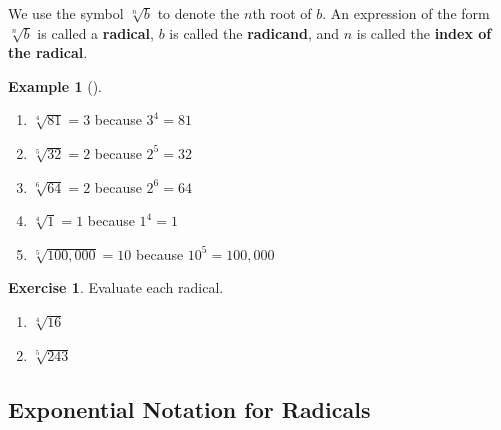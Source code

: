 \documentclass[10pt,]{book}
\newcommand{\terminology}[1]{\textbf{#1}}
\theoremstyle{plain}
\theoremstyle{definition}
\theoremstyle{definition}
\theoremstyle{definition}
\newtheorem{example}[theorem]{Example}
\theoremstyle{definition}
\theoremstyle{definition}
\newtheorem{exercise}[theorem]{Exercise}
\numberwithin{equation}{section}
\begin{document}
   We use the symbol \(\sqrt[n]{b}\) to denote the \(n\)th root of \(b\). An expression of the form \(\sqrt[n]{b}\) is called a \terminology{radical}, \(b\) is called the \terminology{radicand}, and \(n\) is called the \terminology{index of the radical}. 
%
\begin{example}[]\label{example-nth-roots}
\leavevmode%
\begin{enumerate}[label=*\alph**]
\item\hypertarget{li-460}{}\(\sqrt[4]{81} = 3\) because \(3^4 = 81\)\item\hypertarget{li-461}{}\(\sqrt[5]{32} = 2\) because \(2^5 = 32\)\item\hypertarget{li-462}{}\(\sqrt[6]{64} = 2\) because \(2^6 = 64\)\item\hypertarget{li-463}{}\(\sqrt[4]{1} = 1\) because \(1^4 = 1\)\item\hypertarget{li-464}{}\(\sqrt[5]{100,000} = 10\) because \(10^5 = 100,000\)\end{enumerate}
\end{example}
\begin{exercise}\label{exercise-nth-roots}
Evaluate each radical.
        \leavevmode%
\begin{enumerate}[label=*\alph**]
\item\hypertarget{li-465}{}\(\sqrt[4]{16}\)\item\hypertarget{li-466}{}\(\sqrt[5]{243}\)\end{enumerate}

\end{exercise}
\typeout{************************************************}
\typeout{************************************************}
\subsection[Exponential Notation for Radicals]{Exponential Notation for Radicals}\label{subsection-68}
\end{document}
